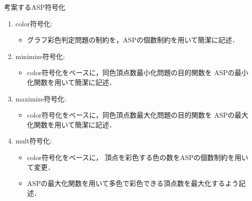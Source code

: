 \documentclass[dvipdfmx,11pt]{beamer}
\begin{document}
\begin{frame}{ 考案するASP符号化}
 \begin{enumerate}
  \item \alert{color符号化}:
        \begin{itemize}
         \item グラフ彩色判定問題の制約を，ASPの個数制約を用いて簡潔に記述．
        \end{itemize}
  \item \alert{minimize符号化}:
        \begin{itemize}
         \item color符号化をベースに，同色頂点数最小化問題の目的関数を%
               ASPの最小化関数を用いて簡潔に記述．
        \end{itemize}
  \item \alert{maximize符号化}:
        \begin{itemize}
         \item color符号化をベースに，同色頂点数最大化問題の目的関数を
               ASPの最大化関数を用いて簡潔に記述．
        \end{itemize}
  \item \alert{mult符号化}:
        \begin{itemize}
         \item color符号化をベースに，%
               頂点を彩色する色の数をASPの個数制約を用いて変更．%
         \item ASPの最大化関数を用いて多色で彩色できる頂点数を最大化するよう記述．
        \end{itemize}
 \end{enumerate}
\end{frame}

\end{document}
